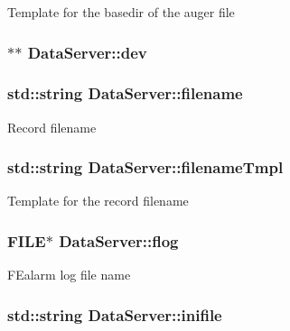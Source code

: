 Template for the basedir of the auger file \hypertarget{classDataServer_a633e024ceb49f38f68a3f2cff5303cb4}{
\subsubsection[{dev}]{$\ast$$\ast$ Data\-Server\-::dev\hspace{0.3cm}{\ttfamily [private]}}}\label{classDataServer_a633e024ceb49f38f68a3f2cff5303cb4}
\hypertarget{classDataServer_a7c825f2bc5af741b549dfd9b85d75bd3}{
\subsubsection[{filename}]{\setlength{\rightskip}{0pt plus 5cm}std\-::string Data\-Server\-::filename\hspace{0.3cm}{\ttfamily [private]}}}\label{classDataServer_a7c825f2bc5af741b549dfd9b85d75bd3}
Record filename \hypertarget{classDataServer_ae852f154e0a58505271bbcc9f2e23e28}{
\subsubsection[{filename\-Tmpl}]{\setlength{\rightskip}{0pt plus 5cm}std\-::string Data\-Server\-::filename\-Tmpl\hspace{0.3cm}{\ttfamily [private]}}}\label{classDataServer_ae852f154e0a58505271bbcc9f2e23e28}
Template for the record filename \hypertarget{classDataServer_a9b3b01c8057f00335cc4d81afb8d177a}{
\subsubsection[{flog}]{\setlength{\rightskip}{0pt plus 5cm}F\-I\-L\-E$\ast$ Data\-Server\-::flog\hspace{0.3cm}{\ttfamily [private]}}}\label{classDataServer_a9b3b01c8057f00335cc4d81afb8d177a}
F\-Ealarm log file name \hypertarget{classDataServer_adb52183f12445a883b10c7081fa828a3}{
\subsubsection[{inifile}]{\setlength{\rightskip}{0pt plus 5cm}std\-::string Data\-Server\-::inifile\hspace{0.3cm}{\ttfamily [private]}}}\label{classDataServer_adb52183f12445a883b10c7081fa828a3}
